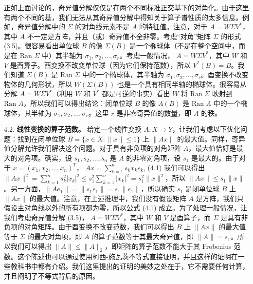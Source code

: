 正如上面讨论的，奇异值分解仅仅是在两个不同标准正交基下的对角化。由于这里有两个不同的基，我们无法从其奇异值分解中得知关于算子谱性质的太多信息。例如，奇异值分解中的 $\Sigma$ 的对角线元素不是 $A$ 的特征值。注意，对于 $A = W \Sigma V^*$，其中 $A$ 不一定是方阵，并且（或）奇异值不全非零。考虑“对角”矩阵 $\Sigma$ 的形式 (3.5)。很容易看出单位球 $B$ 的像 $\Sigma(B)$ 是一个椭球体（不是在整个空间中，而是在 $\text{Ran } \Sigma$ 中）其半轴为 $\sigma_1, \sigma_2, \dots, \sigma_r$。考虑一般情况， $A = W \Sigma V^*$，其中 $W$ 和 $V$ 是酉算子。酉变换不改变单位球（因为它们保持范数），所以 $V^*(B) = B$。我们知道 $\Sigma(B)$ 是 $\text{Ran } \Sigma$ 中的一个椭球体，其半轴为 $\sigma_1, \sigma_2, \dots, \sigma_r$。酉变换不改变物体的几何形状，所以 $W(\Sigma(B))$ 也是一个具有相同半轴的椭球体。很容易从分解 $A = W \Sigma V^*$（利用 $W$ 和 $V^*$ 都是可逆的事实）看出 $W$ 将 $\text{Ran } \Sigma$ 映射到 $\text{Ran } A$，所以我们可以得出结论：闭单位球 $B$ 的像 $A(B)$ 是 $\text{Ran } A$ 中的一个椭球体，其半轴为 $\sigma_1, \sigma_2, \dots, \sigma_r$。这里 $r$ 是非零奇异值的数量，即 $A$ 的秩。

4.2. \textbf{线性变换的算子范数。} 给定一个线性变换 $A: X \to Y$，让我们考虑以下优化问题：找到在闭单位球 $B = \{x \in X : \|x\| \leq 1\}$ 上 $\|Ax\|$ 的最大值。同样，奇异值分解允许我们解决这个问题。对于具有非负项的对角矩阵 $A$，最大值恰好是最大的对角项。确实，设 $s_1, s_2, \dots, s_n$ 是 $A$ 的非零对角项，设 $s_1$ 是最大的。由于对于 $x = (x_1, x_2, \dots, x_n)^T$，
$Ax = \sum_{k=1}^n s_k x_k e_k$, (4.1)
我们可以得出 $\|Ax\|^2 = \sum_{k=1}^n s_k^2 |x_k|^2 \leq s_1^2 \sum_{k=1}^n |x_k|^2 = s_1^2 \|x\|^2$，所以 $\|Ax\| \leq s_1 \|x\|$。另一方面，$\|Ae_1\| = \|s_1 e_1\| = s_1 \|e_1\|$，所以确实 $s_1$ 是闭单位球 $B$ 上 $\|Ax\|$ 的最大值。注意，在上述推理中，我们没有假设矩阵 $A$ 是方阵，我们只假设主对角线以外的所有项都为零，所以公式 (4.1) 成立。为了处理一般情况，让我们考虑奇异值分解 (3.5)， $A = W \Sigma V^*$，其中 $W$ 和 $V$ 是酉算子，而 $\Sigma$ 是具有非负项的对角矩阵。由于酉变换不改变范数，我们可以得出 $B$ 上 $\|Ax\|$ 的最大值等于 $\Sigma$ 的最大对角项，即 $A$ 的算子范数等于其最大奇异值，即 $\|A\| = s_1$。所以我们可以得出 $\|A\| \leq \|A\|_2$，即矩阵的算子范数不能大于其 Frobenius 范数。这个陈述也可以通过使用柯西-施瓦茨不等式直接证明，并且这样的证明在一些教科书中都有介绍。我们这里提出的证明的美妙之处在于，它不需要任何计算，并且阐明了不等式背后的原因。

